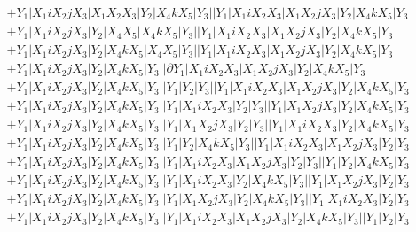 \documentclass{article}[12pt]
\begin{document}
\begin{align*}
 & +Y_1|X_1iX_2jX_3|X_1X_2X_3|Y_2|X_4kX_5|Y_3||Y_1|X_1iX_2X_3|X_1X_2jX_3|Y_2|X_4kX_5|Y_3\\ 
 & +Y_1|X_1iX_2jX_3|Y_2|X_4X_5|X_4kX_5|Y_3||Y_1|X_1iX_2X_3|X_1X_2jX_3|Y_2|X_4kX_5|Y_3\\ 
 & +Y_1|X_1iX_2jX_3|Y_2|X_4kX_5|X_4X_5|Y_3||Y_1|X_1iX_2X_3|X_1X_2jX_3|Y_2|X_4kX_5|Y_3\\ 
 & +Y_1|X_1iX_2jX_3|Y_2|X_4kX_5|Y_3||\partial Y_1|X_1iX_2X_3|X_1X_2jX_3|Y_2|X_4kX_5|Y_3\\ 
 & +Y_1|X_1iX_2jX_3|Y_2|X_4kX_5|Y_3||Y_1|Y_2|Y_3||Y_1|X_1iX_2X_3|X_1X_2jX_3|Y_2|X_4kX_5|Y_3\\ 
 & +Y_1|X_1iX_2jX_3|Y_2|X_4kX_5|Y_3||Y_1|X_1iX_2X_3|Y_2|Y_3||Y_1|X_1X_2jX_3|Y_2|X_4kX_5|Y_3\\ 
 & +Y_1|X_1iX_2jX_3|Y_2|X_4kX_5|Y_3||Y_1|X_1X_2jX_3|Y_2|Y_3||Y_1|X_1iX_2X_3|Y_2|X_4kX_5|Y_3\\ 
 & +Y_1|X_1iX_2jX_3|Y_2|X_4kX_5|Y_3||Y_1|Y_2|X_4kX_5|Y_3||Y_1|X_1iX_2X_3|X_1X_2jX_3|Y_2|Y_3\\ 
 & +Y_1|X_1iX_2jX_3|Y_2|X_4kX_5|Y_3||Y_1|X_1iX_2X_3|X_1X_2jX_3|Y_2|Y_3||Y_1|Y_2|X_4kX_5|Y_3\\ 
 & +Y_1|X_1iX_2jX_3|Y_2|X_4kX_5|Y_3||Y_1|X_1iX_2X_3|Y_2|X_4kX_5|Y_3||Y_1|X_1X_2jX_3|Y_2|Y_3\\ 
 & +Y_1|X_1iX_2jX_3|Y_2|X_4kX_5|Y_3||Y_1|X_1X_2jX_3|Y_2|X_4kX_5|Y_3||Y_1|X_1iX_2X_3|Y_2|Y_3\\ 
 & +Y_1|X_1iX_2jX_3|Y_2|X_4kX_5|Y_3||Y_1|X_1iX_2X_3|X_1X_2jX_3|Y_2|X_4kX_5|Y_3||Y_1|Y_2|Y_3\\ 
 \end{align*}
\end{document}
